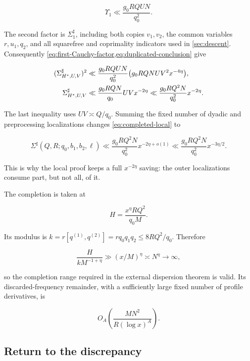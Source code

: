 \begin{equation}\label{eq:first-Cauchy-factor}
 \Upsilon_1\ll\frac{g_0RQUN}{q_0^2}.
\end{equation}

The second factor is $\Sigma_1^\sharp$, including both copies $v_1,v_2$,
the common variables $r,u_1,q_2$, and all squarefree and coprimality
indicators used in \cref{sec:descent}.  Consequently
\cref{eq:first-Cauchy-factor,eq:duplicated-conclusion} give

\begin{align}
 (\Sigma^\sharp_{H^*,U,V})^2
 &\ll \frac{g_0RQUN}{q_0^2}
       \bigl(g_0RQNUV^2x^{-4\eta}\bigr),\notag\\
 \Sigma^\sharp_{H^*,U,V}
 &\ll\frac{g_0RQN}{q_0}UVx^{-2\eta}
 \ll\frac{g_0RQ^2N}{q_0^2}x^{-2\eta}.
 \label{eq:completed-local}
\end{align}

The last inequality uses $UV\asymp Q/q_0$.  Summing the fixed number of
dyadic and preprocessing localizations changes \cref{eq:completed-local} to

\begin{equation}\label{eq:completed-summed}
 \Sigma^\sharp(Q,R;q_0,b_1,b_2,\ell)
 \ll\frac{g_0RQ^2N}{q_0^2}x^{-2\eta+o(1)}
 \ll\frac{g_0RQ^2N}{q_0^2}x^{-3\eta/2}.
\end{equation}

This is why the local proof keeps a full $x^{-2\eta}$ saving: the outer
localizations consume part, but not all, of it.

The completion is taken at

\[
 H=\frac{x^\eta RQ^2}{q_0M}.
\]

Its modulus is
$k=r[q^{(1)},q^{(2)}]=rq_0q_1q_2\le8RQ^2/q_0$.  Therefore

\[
 \frac{H}{kM^{-1+\eta}}
 \gg (x/M)^\eta\asymp N^\eta\longrightarrow\infty,
\]

so the completion range required in the external dispersion theorem is
valid.  Its discarded-frequency remainder, with a sufficiently large fixed
number of profile derivatives, is

\begin{equation}\label{eq:completion-remainder}
 O_A\left(\frac{MN^2}{R(\log x)^A}\right).
\end{equation}

\subsection{Return to the discrepancy}


